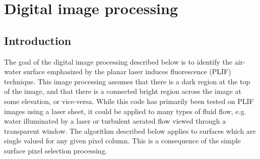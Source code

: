 \chapter{Digital image processing} \label{chp:proc}
%
\section{Introduction}
\par
The goal of the digital image processing described below is to identify the air-water surface emphasized by the planar laser induces fluorescence (PLIF) technique.
This image processing assumes that there is a dark region at the top of the image, and that there is a connected bright region across the image at some elevation, or vice-versa. 
While this code has primarily been tested on PLIF images using a laser sheet, it could be applied to many types of fluid flow, e.g. water illuminated by a laser or turbulent aerated flow viewed through a transparent window.
The algorithm described below applies to surfaces which are single valued for any given pixel column.
This is a consequence of the simple surface pixel selection processing. 
%
